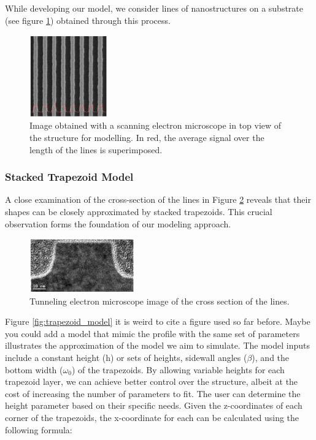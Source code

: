  \medskip

While developing our model, we consider lines of nanostructures on a substrate (see figure \ref{fig:lines}) obtained through this process.

\begin{figure}[h]
    \centering
    \includegraphics[width=0.3\textwidth]{images/lines_modeled.png}
    \caption{Image obtained with a scanning electron microscope in top view of the structure for modelling. 
    In red, the average signal over the length of the lines is superimposed.\cite{these_reche}}
    \label{fig:lines}
\end{figure}

\subsubsection{Stacked Trapezoid Model}

A close examination of the cross-section of the lines in Figure \ref{fig:trapezoid} reveals that their shapes can be closely approximated by stacked trapezoids. This crucial observation forms the foundation of our modeling approach.

\medskip

\begin{figure}[h]
    \centering
    \includegraphics[width=0.4\textwidth]{images/trap_model.PNG}
    \caption{Tunneling electron microscope image of the cross section of the lines.\cite{phd_freychet}}
    \label{fig:trapezoid}
\end{figure}


Figure \ref{fig:trapezoid_model} \color{red} it is weird to cite a figure used so far before. Maybe you could add a model that mimic the profile with the same set of parameters \color{black} 
illustrates the approximation of the model we aim to simulate. 
The model inputs include a constant height (h) or sets of heights, sidewall angles ($\beta$), and the
bottom width ($\omega_{0}$) of the trapezoids. By allowing variable heights for each trapezoid layer, we can 
achieve better control over the structure, albeit at the cost of increasing the number of 
parameters to fit. The user can determine the height parameter based on their specific needs. 
Given the z-coordinates of each corner of the trapezoids, the x-coordinate for each can be 
calculated using the following formula:

